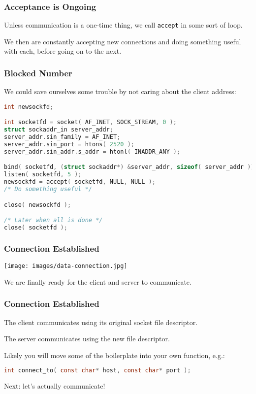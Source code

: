 \begin{frame}
	\frametitle{Acceptance is Ongoing}

	Unless communication is a one-time thing, we call \texttt{accept} in some sort of loop.

	We then are constantly accepting new connections and doing something useful with each, before going on to the next.

\end{frame}


\begin{frame}[fragile]
	\frametitle{Blocked Number}

	We could save ourselves some trouble by not caring about the client address:

	\begin{lstlisting}[language=C]
int newsockfd;

int socketfd = socket( AF_INET, SOCK_STREAM, 0 );
struct sockaddr_in server_addr;
server_addr.sin_family = AF_INET;
server_addr.sin_port = htons( 2520 );
server_addr.sin_addr.s_addr = htonl( INADDR_ANY );

bind( socketfd, (struct sockaddr*) &server_addr, sizeof( server_addr ));
listen( socketfd, 5 );
newsockfd = accept( socketfd, NULL, NULL );
/* Do something useful */

close( newsockfd );

/* Later when all is done */
close( socketfd );
\end{lstlisting}



\end{frame}


\begin{frame}
	\frametitle{Connection Established}

	\begin{center}
		\texttt{[image: images/data-connection.jpg]}
	\end{center}

	We are finally ready for the client and server to communicate.

\end{frame}


\begin{frame}[fragile]
	\frametitle{Connection Established}

	The client communicates using its original socket file descriptor.

	The server communicates using the new file descriptor.

	Likely you will move some of the boilerplate into your own function, e.g.:

	\begin{lstlisting}[language=C]
int connect_to( const char* host, const char* port ); 
\end{lstlisting}

	Next: let's actually communicate!

\end{frame}




